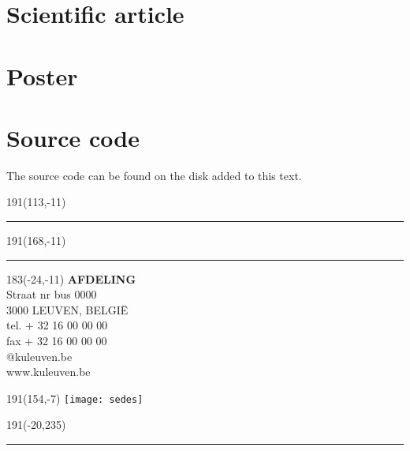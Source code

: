 \documentclass[12pt,a4paper,oneside]{book}
\begin{document}






\chapter{Scientific article}


\chapter{Poster}


\chapter{Source code}

The source code can be found on the disk added to this text.



\newpage
\thispagestyle{empty}
\sffamily
%
\begin{textblock}{191}(113,-11)
{\color{blueline}\rule{160pt}{5.5pt}}
\end{textblock}
%
\begin{textblock}{191}(168,-11)
{\color{blueline}\rule{5.5pt}{59pt}}
\end{textblock}
%
\begin{textblock}{183}(-24,-11)
\textblockcolour{}
\flushright
\fontsize{7}{7.5}\selectfont
\textbf{AFDELING}\\
Straat nr bus 0000\\
3000 LEUVEN, BELGI\"{E}\\
tel. + 32 16 00 00 00\\
fax + 32 16 00 00 00\\
@kuleuven.be\\
www.kuleuven.be\\
\end{textblock}
%
\begin{textblock}{191}(154,-7)
\textblockcolour{}
\texttt{[image: sedes]}
\end{textblock}
%
\begin{textblock}{191}(-20,235)
{\color{bluetitle}\rule{544pt}{55pt}}
\end{textblock}
\end{document}
